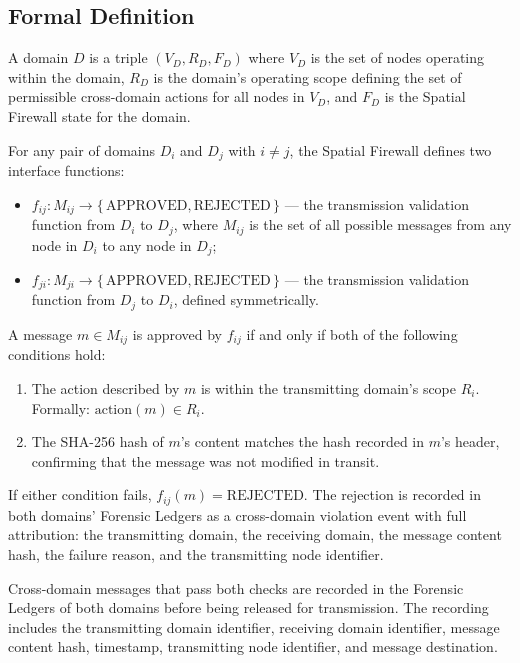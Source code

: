\subsection{Formal Definition}\label{sec:spatial-firewall-formal}

A \bxthree{} domain $D$ is a triple $(V_D, R_D, F_D)$ where $V_D$ is the set of nodes operating within the domain, $R_D$ is the domain's operating scope defining the set of permissible cross-domain actions for all nodes in $V_D$, and $F_D$ is the Spatial Firewall state for the domain.

For any pair of domains $D_i$ and $D_j$ with $i \neq j$, the Spatial Firewall defines two interface functions:

\begin{itemize}\itemsep=0pt
\item $f_{ij} : M_{ij} \to \{\,\text{APPROVED}, \text{REJECTED}\,\}$ — the transmission validation function from $D_i$ to $D_j$, where $M_{ij}$ is the set of all possible messages from any node in $D_i$ to any node in $D_j$;
\item $f_{ji} : M_{ji} \to \{\,\text{APPROVED}, \text{REJECTED}\,\}$ — the transmission validation function from $D_j$ to $D_i$, defined symmetrically.
\end{itemize}

A message $m \in M_{ij}$ is approved by $f_{ij}$ if and only if both of the following conditions hold:

\begin{enumerate}\itemsep=0pt
\item[\textbf{Scope consistency.}] The action described by $m$ is within the transmitting domain's scope $R_i$. Formally: $\text{action}(m) \in R_i$.
\item[\textbf{Integrity.}] The SHA-256 hash of $m$'s content matches the hash recorded in $m$'s header, confirming that the message was not modified in transit.
\end{enumerate}

If either condition fails, $f_{ij}(m) = \text{REJECTED}$. The rejection is recorded in both domains' Forensic Ledgers as a cross-domain violation event with full attribution: the transmitting domain, the receiving domain, the message content hash, the failure reason, and the transmitting node identifier.

Cross-domain messages that pass both checks are recorded in the Forensic Ledgers of both domains before being released for transmission. The recording includes the transmitting domain identifier, receiving domain identifier, message content hash, timestamp, transmitting node identifier, and message destination.

